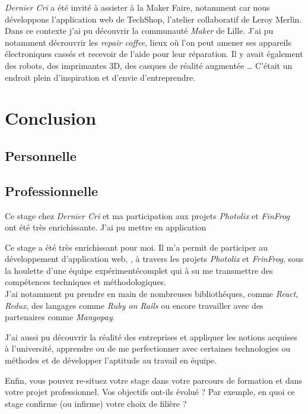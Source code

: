 \emph{Dernier Cri} a été invité à assister à la Maker Faire, notamment
car nous développons l'application web de TechShop, l'atelier
collaboratif de Leroy Merlin. Dans ce contexte j'ai pu découvrir la
communauté \emph{Maker} de Lille. J'ai pu notamment décrouvrir les
\emph{repair coffee}, lieux où l'on peut amener ses appareils
électroniques cassés et recevoir de l'aide pour leur réparation. Il y
avait également des robots, des imprimantes 3D, des casques de réalité
augmentée \ldots{} C'était un endroit plein d'inspiration et d'envie
d'entreprendre.

\newpage

\section{Conclusion}\label{conclusion-2}

\subsection{Personnelle}\label{personnelle}

\subsection{Professionnelle}\label{professionnelle}

Ce stage chez \emph{Dernier Cri} et ma participation aux projets
\emph{Photolix} et \emph{FinFrog} ont été très enrichissante. J'ai pu
mettre en application

Ce stage a été très enrichissant pour moi. Il m'a permit de participer
au développement d'application web, , à travers les projets
\emph{Photolix} et \emph{FrinFrog}, sous la houlette d'une équipe
expérimentécomplet qui à su me transmettre des compétences techniques et
méthodologiques.\\
J'ai notamment pu prendre en main de nombreuses bibliothéques, comme
\emph{React}, \emph{Redux}, des langages comme \emph{Ruby on Rails} ou
encore travailler avec des partenaires comme \emph{Mangopay}.

J'ai aussi pu découvrir la réalité des entreprises et appliquer les
notions acquises à l'université, apprendre ou de me perfectionner avec
certaines technologies ou méthodes et de développer l'aptitude au
travail en équipe.

Enfin, vous pouvez re-situez votre stage dans votre parcours de
formation et dans votre projet professionnel. Vos objectifs ont-ils
évolué ? Par exemple, en quoi ce stage confirme (ou infirme) votre choix
de filière ?

